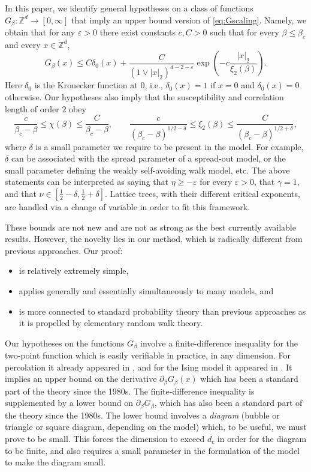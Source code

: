 \documentclass[11pt,a4paper]{article}
\numberwithin{equation}{section}
\theoremstyle{plain}
\theoremstyle{definition}
\newcommand\1{\mathds{1}}
\begin{document}
In this paper, we identify general hypotheses on a class of functions
$G_\beta: \mathbb Z^d \to [0,\infty]$ that
imply an upper bound version of \eqref{eq:Gscaling}. Namely, we obtain that
for any $\varepsilon >0$ there exist constants $c,C>0$ such that for
every $\beta \le \beta_c$ and every $x\in \mathbb Z^d$,
\begin{equation}
\label{eq:Gscaling-precise}
    G_\beta(x)
    \le
    C\delta_{0}(x)
    +
    \frac{C}{(1\vee |x|_2)^{d-2-\varepsilon}}
    \exp\left(-c\frac{|x|_2}{\xi_2(\beta)}\right).
\end{equation}
Here $\delta_0$ is the Kronecker function at $0$, i.e., $\delta_{0}(x)=1$ if $x=0$ and $\delta_{0}(x)=0$ otherwise.
Our hypotheses also imply that the susceptibility and correlation length
of order $2$ obey 
\begin{equation}
\label{eq:critical-exponents}
    \frac{c}{\beta_c-\beta} \le \chi(\beta) \le \frac{C}{\beta_c-\beta},
    \qquad
    \frac{c}{(\beta_c-\beta)^{1/2-\delta}} \le \xi_2 (\beta) \le \frac{C}{(\beta_c-\beta)^{1/2+\delta}},
\end{equation}
where $\delta$ is a small parameter we require to be present in the model.
For example, $\delta$ can be associated with the spread parameter of a spread-out model, or the
small parameter defining the weakly self-avoiding walk model, etc. The above statements can be interpreted as saying that $\eta \ge -\varepsilon$ for every $\varepsilon>0$, that $\gamma=1$, and that $\nu \in [\frac 12 -\delta,
\frac 12 +\delta]$.
Lattice trees, with their different critical exponents, are handled via a change of
variable in order to fit this framework.

These bounds are not new and are not
as strong as the best currently available results. However, the novelty lies in our method, which is radically
different from previous approaches.
Our proof:
\begin{itemize}
\item is relatively extremely simple,
\item
applies generally and essentially simultaneously to many models,
and
\item
is more connected to standard probability theory
than previous approaches as it is propelled by elementary random walk theory.
\end{itemize}

Our hypotheses on the functions $G_\beta$ involve a finite-difference inequality
for the two-point function which is
easily verifiable in practice, in any dimension. For percolation it already appeared in \cite{Hutc19_hyperbolic}, and for the Ising model it appeared in \cite{Pani24_thesis}.
It
implies an upper bound on the derivative $\partial_\beta G_\beta(x)$
which has been a standard part of the theory since the 1980s.
The finite-difference inequality is supplemented by
a lower bound on $\partial_\beta G_\beta$, which has also been a standard
part of the theory since the 1980s.  The lower bound involves a \emph{diagram} (bubble
or triangle or square diagram, depending on the model) which, to be useful, we must prove to be small.  This forces
the dimension to exceed $d_c$ in order for the diagram to be finite,
and also requires a small parameter in the
formulation of the model to make the diagram small.
\end{document}
